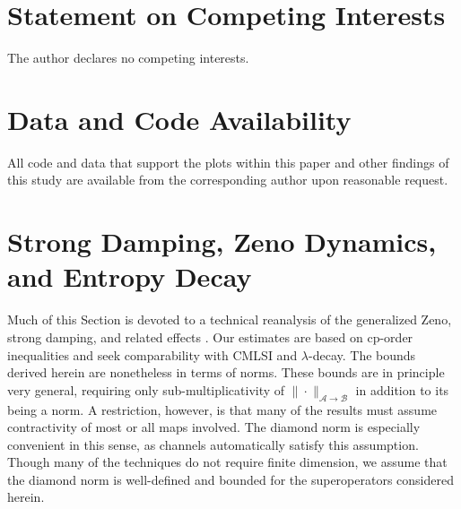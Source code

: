 \documentclass[accepted=2026-02-01, letterpaper]{quantumarticle}
\newcommand{\A}{\mathcal{A}}
\newcommand{\B}{\mathcal{B}}
\begin{document}
\section{Statement on Competing Interests}
The author declares no competing interests.

\section{Data and Code Availability}
All code and data that support the plots within this paper and other findings of this study are available from the corresponding author upon reasonable request.


%

\newpage

\appendix
\newpage

\section{Strong Damping, Zeno Dynamics, and Entropy Decay} \label{app:Zeno}
Much of this Section is devoted to a technical reanalysis of the generalized Zeno, strong damping, and related effects \cite{burgarth_generalized_2019, mobus_quantum_2019, burgarth_quantum_2020}. Our estimates are based on cp-order inequalities and seek comparability with CMLSI and $\lambda$-decay. The bounds derived herein are nonetheless in terms of norms. These bounds are in principle very general, requiring only sub-multiplicativity of $\| \cdot \|_{\A \rightarrow \B}$ in addition to its being a norm. A restriction, however, is that many of the results must assume contractivity of most or all maps involved. The diamond norm is especially convenient in this sense, as channels automatically satisfy this assumption. Though many of the techniques do not require finite dimension, we assume that the diamond norm is well-defined and bounded for the superoperators considered herein.
\end{document}
